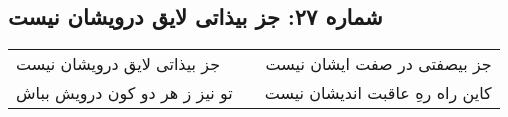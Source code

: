 \begin{center}
\section*{شماره ۲۷: جز بیذاتی لایق درویشان نیست}
\label{sec:027}
\begin{longtable}{l p{0.5cm} r}
جز بیذاتی لایق درویشان نیست
&&
جز بیصفتی در صفت ایشان نیست
\\
تو نیز ز هر دو کون درویش بباش
&&
کاین راه رهِ عاقبت اندیشان نیست
\\
\end{longtable}
\end{center}
